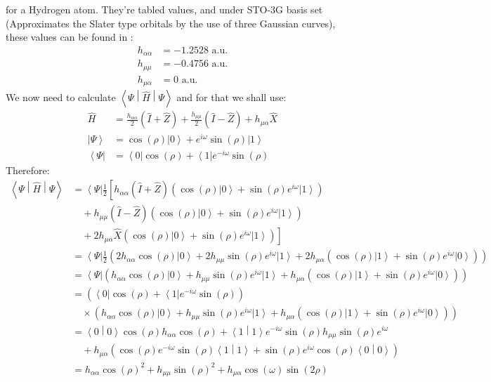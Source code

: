 \documentclass{aux/ttuthes2007}
\newcommand{\bra}[1]{\ensuremath{\left\langle#1\right\vert}}
\newcommand{\ket}[1]{\ensuremath{\left|#1\right\rangle}}
\newcommand{\braket}[2]{\left< #1 \middle\vert #2 \right>}
\newcommand{\sandwich}[3]{\left< #1 \middle\vert #2 \middle\vert #3 \right>}
\newcommand{\s}[1]{\sin\left( #1 \right)}
\newcommand{\co}[1]{\cos\left( #1 \right)}
\newcommand{\paren}[1]{\left( #1 \right)}
\begin{document}
for a Hydrogen atom. They're tabled values, and under STO-3G basis set (Approximates the Slater type orbitals by the use of three Gaussian curves), these values can be found in :
\begin{equation*}
	\begin{split}
		h_{\alpha\alpha} &= -1.2528 \text{ a.u.} \\
		h_{\mu\mu} &= -0.4756 \text{ a.u.}\\
		h_{\mu\alpha} &= 0 \text{ a.u.}
	\end{split}
\end{equation*}
%
We now need to calculate $\sandwich{\Psi}{\hat H}{\Psi}$ and for that we shall use:
%
\begin{equation*}
	\begin{split}
		\hat H 
		&= \frac{h_{\alpha\alpha}}{2} \paren{\hat I + \hat Z}
		+ \frac{h_{\mu\mu}}{2} \paren{\hat I - \hat Z} 
		+ h_{\mu\alpha} \hat X\\
		\ket \Psi 
		&= \co \rho \ket 0 + e^{i \omega} \s \rho \ket 1 \\
		\bra \Psi 
		&= \bra 0 \co \rho  + \bra 1 e^{-i \omega} \s \rho 
	\end{split}
\end{equation*}
%
Therefore:
%
\begin{equation*}
	\begin{split}
		\sandwich \Psi {\hat H} \Psi
		&= \bra \Psi \frac 1 2 \left[
			h_{\alpha\alpha} (\hat I + \hat Z) \paren{\co \rho \ket 0 + \s \rho e^{i\omega} \ket 1} \right .\\
		& \quad + h_{\mu\mu} (\hat I - \hat Z) \paren{\co \rho \ket 0 + \s \rho e^{i\omega} \ket 1} \\
		&\left. \quad + 2 h_{\mu\alpha} \hat X \paren{\co \rho \ket 0 + \s \rho e^{i\omega} \ket 1}
		\right] \\
		&= \bra \Psi \frac 1 2 \left(
			2h_{\alpha\alpha} \co \rho \ket 0 + 2h_{\mu\mu} \s \rho e^{i\omega} \ket 1
			+ 2h_{\mu\alpha} \paren{\co \rho \ket 1 + \s \rho e^{i\omega} \ket 0}
		\right) \\
		&= \bra \Psi \left(
			h_{\alpha\alpha} \co \rho \ket 0 + h_{\mu\mu} \s \rho e^{i\omega} \ket 1
			+ h_{\mu\alpha} \paren{\co \rho \ket 1 + \s \rho e^{i\omega} \ket 0}
		\right) \\
		&= \paren{\bra 0 \co \rho  + \bra 1 e^{-i \omega} \s \rho } \\
		& \quad \times \left (
			h_{\alpha\alpha} \co \rho \ket 0 + h_{\mu\mu} \s \rho e^{i\omega} \ket 1
			+ h_{\mu\alpha} \paren{\co \rho \ket 1 + \s \rho e^{i\omega} \ket 0}
		\right) \\
		&= \braket 0 0 \co \rho h_{\alpha\alpha} \co \rho 
		+ \braket 1 1 e^{-i \omega} \s \rho h_{\mu\mu} \s \rho e^{i\omega} \\
		&\quad + h_{\mu\alpha} \paren{\co \rho e^{-i \omega} \s \rho \braket 1 1 + \s \rho e^{i\omega} \co \rho \braket 0 0} \\
		&=  h_{\alpha\alpha} \co \rho ^2
		+ h_{\mu\mu} \s \rho ^2
		+ h_{\mu\alpha} \co \omega \s {2\rho}\\
	\end{split}
\end{equation*}
\end{document}
